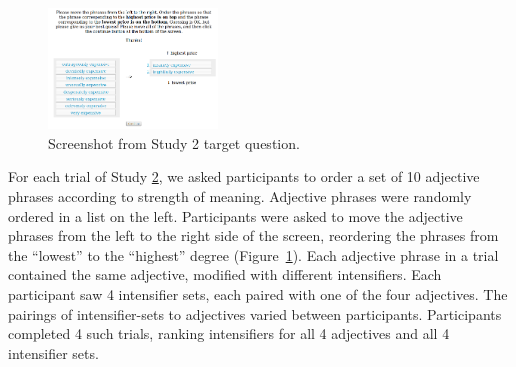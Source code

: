 \documentclass[10pt,letterpaper]{article}
\begin{document}
\begin{figure}[hbt]
\begin{center}
\includegraphics[width=0.4\textwidth]{exp2-q.png}
\end{center}
\caption{Screenshot from Study 2 target question.} 
\label{fig:question_study2}
\end{figure}

For each trial of Study \hyperref[sec:study2]{2}, we asked participants to order a set of 10 adjective phrases according to strength of meaning.
Adjective phrases were randomly ordered in a list on the left.
Participants were asked to move the adjective phrases from the left to the right side of the screen, reordering the phrases from the ``lowest'' to the ``highest'' degree (Figure~\hyperref[fig:question_study2]{\ref{fig:question_study2}}).
Each adjective phrase in a trial contained the same adjective, modified with different intensifiers.
Each participant saw 4 intensifier sets, each paired with one of the four adjectives.
The pairings of intensifier-sets to adjectives varied between participants.
Participants completed 4 such trials, ranking intensifiers for all 4 adjectives and all 4 intensifier sets.

\end{document}
